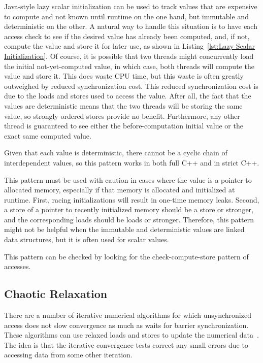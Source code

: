 \documentclass[10]{article}
\begin{document}
Java-style lazy scalar initialization can be used to track values that
are expensive to compute and not known until runtime on the one hand,
but immutable and deterministic on the other.
A natural way to handle this situation is to have each access check
to see if the desired value has already been computed, and, if not,
compute the value and store it for later use, as shown in
Listing~\ref{lst:Lazy Scalar Initialization}.
Of course, it is possible that two threads might concurrently load
the initial not-yet-computed value, in which case, both threads
will compute the value and store it.
This does waste CPU time, but this waste is often greatly outweighed by
reduced synchronization cost.
This reduced synchronization cost is due to the 
loads and stores used to access the value.
After all, the fact that the values are deterministic means that
the two threads will be storing the same value, so strongly ordered
stores provide no benefit.
Furthermore, any other thread is guaranteed to see either the
before-computation initial value or the exact same computed value.

Given that each value is deterministic, there cannot be a cyclic chain
of interdependent values, so this pattern works in both full C++ and in
strict C++.

This pattern must be used with caution in cases where the value is
a pointer to allocated memory, especially if that memory is allocated
and initialized at runtime.
First, racing initializations will result in one-time memory leaks.
Second, a store of a pointer to recently initialized memory should
be a  store or stronger, and the corresponding
loads should be  loads or stronger.
Therefore, this pattern might not be helpful when the immutable and
deterministic values are linked data structures, but it is often used
for scalar values.

This pattern can be checked by looking for the check-compute-store
pattern of accesses.

\subsection{Chaotic Relaxation}
\label{sec:Chaotic Relaxation}

There are a number of iterative numerical algorithms for which unsynchronized
access does not slow convergence as much as waits for barrier synchronization.
These algorithms can use relaxed loads and stores to update the numerical
data~\cite{Andrews91textbook}.
The idea is that the iterative convergence tests correct any small errors
due to accessing data from some other iteration.
\end{document}
